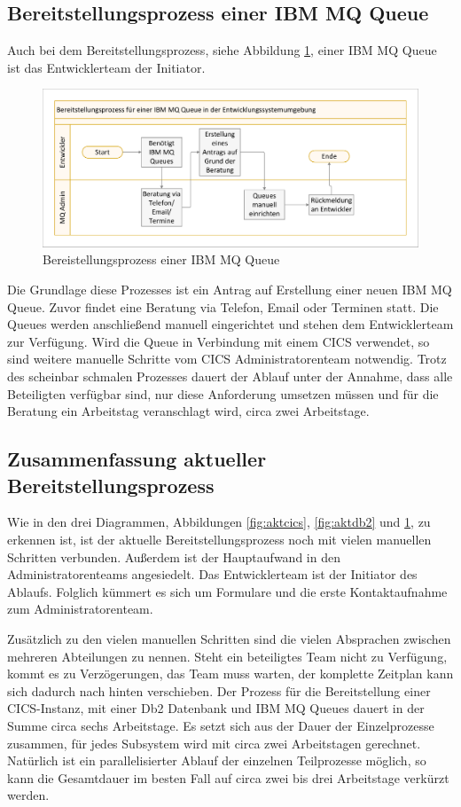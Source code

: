 \subsection{Bereitstellungsprozess einer IBM MQ Queue}
Auch bei dem Bereitstellungsprozess, siehe Abbildung \ref{fig:aktmq}, einer IBM MQ Queue ist das Entwicklerteam der Initiator.

\begin{figure}[ht!]
\centering
\includegraphics[width=\paperwidth,angle=90]{figures/swimlaneMQ.pdf}
\caption{Bereistellungsprozess einer IBM MQ Queue}
\label{fig:aktmq}
\end{figure}

Die Grundlage diese Prozesses ist ein Antrag auf Erstellung einer neuen IBM MQ Queue.
Zuvor findet eine Beratung via Telefon, Email oder Terminen statt.
Die Queues werden anschließend manuell eingerichtet und stehen dem Entwicklerteam zur Verfügung.
Wird die Queue in Verbindung mit einem CICS verwendet, so sind weitere manuelle Schritte vom CICS Administratorenteam notwendig.
Trotz des scheinbar schmalen Prozesses dauert der Ablauf unter der Annahme, dass alle Beteiligten verfügbar sind, nur diese Anforderung umsetzen müssen und für die Beratung ein Arbeitstag veranschlagt wird, circa zwei Arbeitstage.

\subsection{Zusammenfassung aktueller Bereitstellungsprozess}
Wie in den drei Diagrammen, Abbildungen \ref{fig:aktcics}, \ref{fig:aktdb2} und \ref{fig:aktmq}, zu erkennen ist, ist der aktuelle Bereitstellungsprozess noch mit vielen manuellen Schritten verbunden.
Außerdem ist der Hauptaufwand in den Administratorenteams angesiedelt.
Das Entwicklerteam ist der Initiator des Ablaufs.
Folglich kümmert es sich um Formulare und die erste Kontaktaufnahme zum Administratorenteam.

Zusätzlich zu den vielen manuellen Schritten sind die vielen Absprachen zwischen mehreren Abteilungen zu nennen.
Steht ein beteiligtes Team nicht zu Verfügung, kommt es zu Verzögerungen, das Team muss warten, der komplette Zeitplan kann sich dadurch nach hinten verschieben.
Der Prozess für die Bereitstellung einer CICS-Instanz, mit einer Db2 Datenbank und IBM MQ Queues dauert in der Summe circa sechs Arbeitstage.
Es setzt sich aus der Dauer der Einzelprozesse zusammen, für jedes Subsystem wird mit circa zwei Arbeitstagen gerechnet.
Natürlich ist ein parallelisierter Ablauf der einzelnen Teilprozesse möglich, so kann die Gesamtdauer im besten Fall auf circa zwei bis drei Arbeitstage verkürzt werden.

